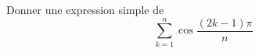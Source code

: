 Donner une expression simple de
\begin{displaymath}
\sum_{k=1}^n \cos \frac{(2k-1)\pi}{n}
\end{displaymath}
\bigskip